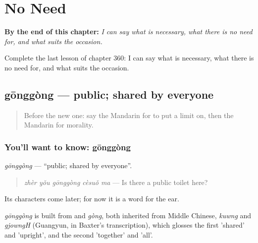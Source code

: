 
\chapter{No Need}
\label{ch:zh-no-need}

\begin{chapteropening}
\textbf{By the end of this chapter:} \emph{I can say what is necessary, what there is no need for, and what suits the occasion.}

Complete the last lesson of chapter 360: I can say what is necessary, what there is no need for, and what suits the occasion.
\end{chapteropening}

\section[gōnggòng]{gōnggòng — public; shared by everyone}

\label{lesson:ZH-C360-gonggong}



\begin{quote}
Before the new one: say the Mandarin for to put a limit on, then the Mandarin for morality.
\end{quote}

\subsection*{You'll want to know: gōnggòng}
\emph{gōnggòng} — \textquotedblleft{}public; shared by everyone\textquotedblright{}.

\begin{quote}
\emph{zhèr yǒu gōnggòng cèsuǒ ma} — Is there a public toilet here?
\end{quote}

Its characters come later; for now it is a word for the ear.

\begin{cousinweb}
\emph{gōnggòng} is built from  and \emph{gòng}, both inherited from Middle Chinese, \emph{kuwng} and \emph{gjowngH} (Guangyun, in Baxter's transcription), which glosses the first 'shared' and 'upright', and the second 'together' and 'all'.
\end{cousinweb}

